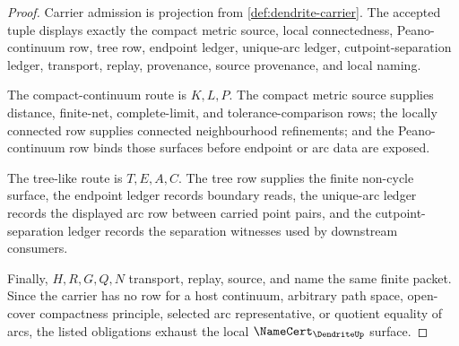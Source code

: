 \begin{proof}
Carrier admission is projection from \autoref{def:dendrite-carrier}. The accepted tuple displays exactly the compact metric source, local connectedness, Peano-continuum row, tree row, endpoint ledger, unique-arc ledger, cutpoint-separation ledger, transport, replay, provenance, source provenance, and local naming.

The compact-continuum route is $K,L,P$. The compact metric source supplies distance, finite-net, complete-limit, and tolerance-comparison rows; the locally connected row supplies connected neighbourhood refinements; and the Peano-continuum row binds those surfaces before endpoint or arc data are exposed.

The tree-like route is $T,E,A,C$. The tree row supplies the finite non-cycle surface, the endpoint ledger records boundary reads, the unique-arc ledger records the displayed arc row between carried point pairs, and the cutpoint-separation ledger records the separation witnesses used by downstream consumers.

Finally, $H,R,G,Q,N$ transport, replay, source, and name the same finite packet. Since the carrier has no row for a host continuum, arbitrary path space, open-cover compactness principle, selected arc representative, or quotient equality of arcs, the listed obligations exhaust the local $\NameCert_{\DendriteUp}$ surface.
\end{proof}

